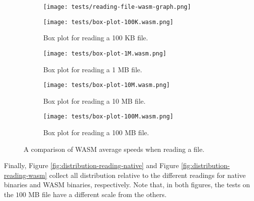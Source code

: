 \begin{figure}[ht!]
  \centering
  \begin{subfigure}[b]{0.78\textwidth}
    \centering
    \texttt{[image: tests/reading-file-wasm-graph.png]}
  \end{subfigure}

  \begin{subfigure}[b]{0.45\textwidth}
    \centering
    \texttt{[image: tests/box-plot-100K.wasm.png]}
    \caption{Box plot for reading a 100 KB file.}
  \end{subfigure}
  \begin{subfigure}[b]{0.45\textwidth}
    \centering
    \texttt{[image: tests/box-plot-1M.wasm.png]}
    \caption{Box plot for reading a 1 MB file.}
  \end{subfigure}
  \begin{subfigure}[b]{0.45\textwidth}
    \centering
    \texttt{[image: tests/box-plot-10M.wasm.png]}
    \caption{Box plot for reading a 10 MB file.}
  \end{subfigure}
  \begin{subfigure}[b]{0.45\textwidth}
    \centering
    \texttt{[image: tests/box-plot-100M.wasm.png]}
    \caption{Box plot for reading a 100 MB file.}
  \end{subfigure}

  \caption{A comparison of WASM average speeds when reading a file.}
  \label{fig:avg-comparison-wasm-speed}
\end{figure}

\clearpage
Finally, Figure \ref{fig:distribution-reading-native} and Figure \ref{fig:distribution-reading-wasm}
collect all distribution relative to the different readings for native binaries and WASM binaries, respectively.
Note that, in both figures, the tests on the $100$ MB file have a different scale from the others.

